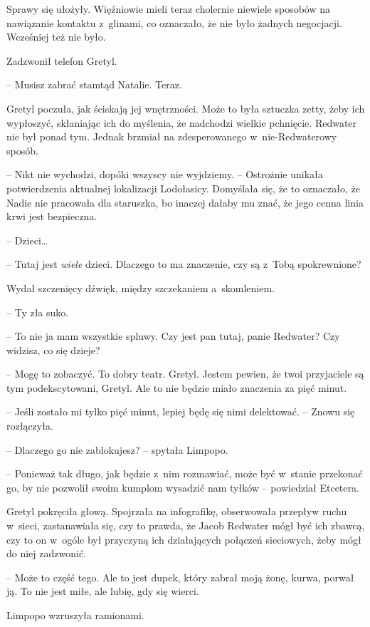 \documentclass[oneside,polish,11pt,sfheadings]{mwbk}
\begin{document}
Sprawy się ułożyły. Więźniowie mieli teraz cholernie niewiele sposobów
na nawiązanie kontaktu z~glinami, co oznaczało, że nie było żadnych
negocjacji. Wcześniej też nie było.

Zadzwonił telefon Gretyl.

-- Musisz zabrać stamtąd Natalie. Teraz.

Gretyl poczuła, jak ściskają jej wnętrzności. Może to była sztuczka
zetty, żeby ich wypłoszyć, skłaniając ich do myślenia, że nadchodzi
wielkie pchnięcie. Redwater nie był ponad tym. Jednak brzmiał na
zdesperowanego w~nie-Redwaterowy sposób.

-- Nikt nie wychodzi, dopóki wszyscy nie wyjdziemy. -- Ostrożnie unikała
potwierdzenia aktualnej lokalizacji Lodołasicy. Domyślała się, że to
oznaczało, że Nadie nie pracowała dla staruszka, bo inaczej dałaby mu
znać, że jego cenna linia krwi jest bezpieczna.

-- Dzieci\ldots 

-- Tutaj jest \textit{wiele} dzieci. Dlaczego to ma znaczenie, czy są z~Tobą spokrewnione?

Wydał szczenięcy dźwięk, między szczekaniem a~skomleniem. 

-- Ty zła suko.

-- To nie ja mam wszystkie spluwy. Czy jest pan tutaj, panie Redwater?
Czy widzisz, co się dzieje?

-- Mogę to zobaczyć. To dobry teatr. Gretyl. Jestem pewien, że twoi
przyjaciele są tym podekscytowani, Gretyl. Ale to nie będzie miało
znaczenia za pięć minut.

-- Jeśli zostało mi tylko pięć minut, lepiej będę się nimi delektować. -- Znowu się rozłączyła.

-- Dlaczego go nie zablokujesz? -- spytała Limpopo.

-- Ponieważ tak długo, jak będzie z~nim rozmawiać, może być w~stanie
przekonać go, by nie pozwolił swoim kumplom wysadzić nam tyłków -- powiedział Etcetera.

Gretyl pokręciła głową. Spojrzała na infografikę, obserwowała przepływ
ruchu w~sieci, zastanawiała się, czy to prawda, że Jacob Redwater mógł
być ich zbawcą, czy to on w~ogóle był przyczyną ich działających
połączeń sieciowych, żeby mógł do niej zadzwonić. 

-- Może to część tego. Ale to jest dupek, który zabrał moją żonę, kurwa, porwał ją. To nie jest
miłe, ale lubię, gdy się wierci.

Limpopo wzruszyła ramionami. 
\end{document}
